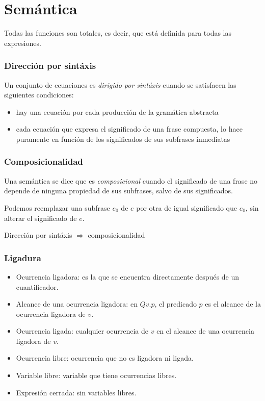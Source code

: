 \section{Semántica}
  \PN Todas las funciones son totales, es decir, que está definida para todas las expresiones.

  \subsubsection*{Dirección por sintáxis}
    \PN Un conjunto de ecuaciones es \textit{dirigido por sintáxis} cuando se satisfacen las siguientes condiciones:
    \begin{itemize}
      \item hay una ecuación por cada producción de la gramática abstracta
      \item cada ecuación que expresa el significado de una frase compuesta, lo hace puramente en función de los significados de sus subfrases inmediatas
    \end{itemize}
    
  \subsubsection*{Composicionalidad}
    \PN Una semántica se dice que es \textit{composicional} cuando el significado de una frase no depende de ninguna propiedad de sus subfrases, salvo de sus significados.

    \PN Podemos reemplazar una subfrase $e_0$ de $e$ por otra de igual significado que $e_0$, sin alterar el significado de $e$.

  \vspace{5mm}
  \PN Dirección por sintáxis $\Rightarrow$ composicionalidad

  \subsubsection*{Ligadura}
    \begin{itemize}
      \item Ocurrencia ligadora: es la que se encuentra directamente después de un cuantificador.
      \item Alcance de una ocurrencia ligadora: en $Qv.p$, el predicado $p$ es el alcance de la ocurrencia ligadora de $v$.
      \item Ocurrencia ligada: cualquier ocurrencia de $v$ en el alcance de una ocurrencia ligadora de $v$.
      \item Ocurrencia libre: ocurrencia que no es ligadora ni ligada.
      \item Variable libre: variable que tiene ocurrencias libres.
      \item Expresión cerrada: sin variables libres.
    \end{itemize}

